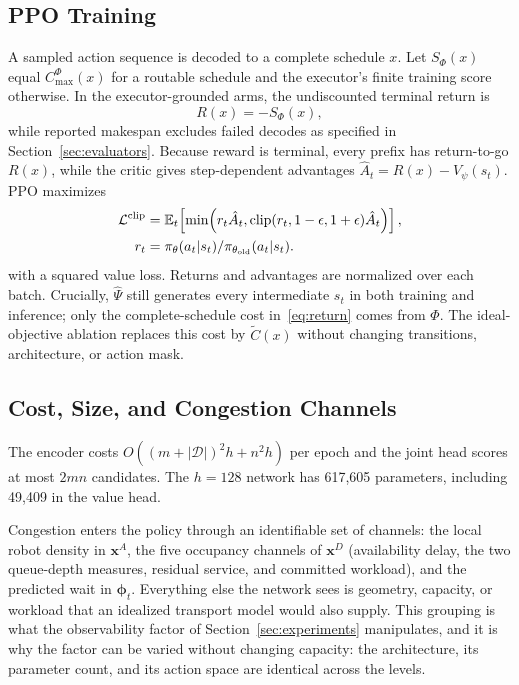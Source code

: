 \subsection{PPO Training}
\label{sec:training}

A sampled action sequence is decoded to a complete schedule $x$. Let
$S_\Phi(x)$ equal $C_{\max}^{\Phi}(x)$ for a routable schedule and the
executor's finite training score otherwise. In the executor-grounded arms, the
undiscounted terminal return is
\begin{equation}
 R(x)=-S_\Phi(x),
 \label{eq:return}
\end{equation}
while reported makespan excludes failed decodes as specified in
Section~\ref{sec:evaluators}. Because reward is terminal, every prefix has
return-to-go $R(x)$, while the critic gives
step-dependent advantages $\hat A_t=R(x)-V_\psi(s_t)$. PPO maximizes
\begin{align}
 \mathcal L^{\rm clip}
 &=\mathbb E_t\!\left[\min\!\left(r_t\hat A_t,
 \operatorname{clip}(r_t,1-\epsilon,1+\epsilon)\hat A_t\right)\right],
 \label{eq:ppo}
 \\
 r_t&=\pi_\theta(a_t|s_t)/\pi_{\theta_{\rm old}}(a_t|s_t).\nonumber
\end{align}
with a squared value loss. Returns and advantages are normalized over each
batch. Crucially, $\hat\Psi$ still generates every intermediate $s_t$ in both
training and inference; only the complete-schedule cost in~\eqref{eq:return}
comes from $\Phi$. The ideal-objective ablation replaces this cost by
$\widetilde C(x)$ without changing transitions, architecture, or action mask.

\subsection{Cost, Size, and Congestion Channels}
\label{sec:arch-cost}

The encoder costs $O((m+|\mathcal D|)^2h+n^2h)$ per epoch and the joint head
scores at most $2mn$ candidates. The $h=128$ network has 617,605 parameters,
including 49,409 in the value head.

Congestion enters the policy through an identifiable set of channels: the
local robot density in $\bm x^A$, the five occupancy channels of $\bm x^D$
(availability delay, the two queue-depth measures, residual service, and
committed workload), and the predicted wait in $\bm\phi_t$. Everything else
the network sees is geometry, capacity, or workload that an idealized
transport model would also supply. This grouping is what the observability
factor of Section~\ref{sec:experiments} manipulates, and it is why the
factor can be varied without changing capacity: the architecture, its
parameter count, and its action space are identical across the levels.
